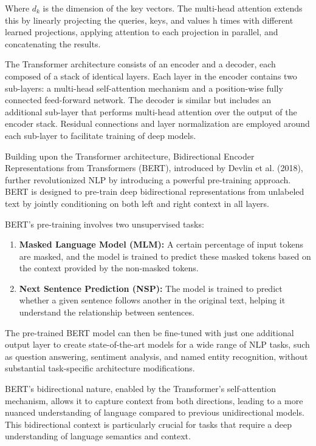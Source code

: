 Where $d_k$ is the dimension of the key vectors. The multi-head attention extends this by linearly projecting the queries, keys, and values h times with different learned projections, applying attention to each projection in parallel, and concatenating the results.

The Transformer architecture consists of an encoder and a decoder, each composed of a stack of identical layers. Each layer in the encoder contains two sub-layers: a multi-head self-attention mechanism and a position-wise fully connected feed-forward network. The decoder is similar but includes an additional sub-layer that performs multi-head attention over the output of the encoder stack. Residual connections and layer normalization are employed around each sub-layer to facilitate training of deep models.

Building upon the Transformer architecture, Bidirectional Encoder Representations from Transformers (BERT), introduced by Devlin et al. (2018), further revolutionized NLP by introducing a powerful pre-training approach. BERT is designed to pre-train deep bidirectional representations from unlabeled text by jointly conditioning on both left and right context in all layers.

BERT's pre-training involves two unsupervised tasks:

\begin{enumerate}
    \item \textbf{Masked Language Model (MLM):} A certain percentage of input tokens are masked, and the model is trained to predict these masked tokens based on the context provided by the non-masked tokens.
    \item \textbf{Next Sentence Prediction (NSP):} The model is trained to predict whether a given sentence follows another in the original text, helping it understand the relationship between sentences.
\end{enumerate}


The pre-trained BERT model can then be fine-tuned with just one additional output layer to create state-of-the-art models for a wide range of NLP tasks, such as question answering, sentiment analysis, and named entity recognition, without substantial task-specific architecture modifications.

BERT's bidirectional nature, enabled by the Transformer's self-attention mechanism, allows it to capture context from both directions, leading to a more nuanced understanding of language compared to previous unidirectional models. This bidirectional context is particularly crucial for tasks that require a deep understanding of language semantics and context.

